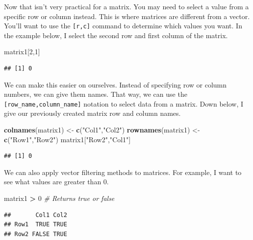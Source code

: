 \documentclass[
]{book}
\newenvironment{Shaded}{\begin{snugshade}}{\end{snugshade}}
\newcommand{\CommentTok}[1]{\textcolor[rgb]{0.56,0.35,0.01}{\textit{#1}}}
\newcommand{\DecValTok}[1]{\textcolor[rgb]{0.00,0.00,0.81}{#1}}
\newcommand{\KeywordTok}[1]{\textcolor[rgb]{0.13,0.29,0.53}{\textbf{#1}}}
\newcommand{\NormalTok}[1]{#1}
\newcommand{\OperatorTok}[1]{\textcolor[rgb]{0.81,0.36,0.00}{\textbf{#1}}}
\newcommand{\StringTok}[1]{\textcolor[rgb]{0.31,0.60,0.02}{#1}}
\begin{document}
Now that isn't very practical for a matrix. You may need to select a value from a specific row or column instead. This is where matrices are different from a vector. You'll want to use the \texttt{{[}r,c{]}} command to determine which values you want. In the example below, I select the second row and first column of the matrix.

\begin{Shaded}
\begin{Highlighting}[]
\NormalTok{matrix1[}\DecValTok{2}\NormalTok{,}\DecValTok{1}\NormalTok{]}
\end{Highlighting}
\end{Shaded}

\begin{verbatim}
## [1] 0
\end{verbatim}

We can make this easier on ourselves. Instead of specifying row or column numbers, we can give them names. That way, we can use the \texttt{{[}row\_name,column\_name{]}} notation to select data from a matrix. Down below, I give our previously created matrix row and column names.

\begin{Shaded}
\begin{Highlighting}[]
\KeywordTok{colnames}\NormalTok{(matrix1) <-}\StringTok{ }\KeywordTok{c}\NormalTok{(}\StringTok{"Col1"}\NormalTok{,}\StringTok{"Col2"}\NormalTok{)}
\KeywordTok{rownames}\NormalTok{(matrix1) <-}\StringTok{ }\KeywordTok{c}\NormalTok{(}\StringTok{"Row1"}\NormalTok{,}\StringTok{"Row2"}\NormalTok{)}
\NormalTok{matrix1[}\StringTok{"Row2"}\NormalTok{,}\StringTok{"Col1"}\NormalTok{]}
\end{Highlighting}
\end{Shaded}

\begin{verbatim}
## [1] 0
\end{verbatim}

We can also apply vector filtering methods to matrices. For example, I want to see what values are greater than 0.

\begin{Shaded}
\begin{Highlighting}[]
\NormalTok{matrix1 }\OperatorTok{>}\StringTok{ }\DecValTok{0} \CommentTok{# Returns true or false}
\end{Highlighting}
\end{Shaded}

\begin{verbatim}
##       Col1 Col2
## Row1  TRUE TRUE
## Row2 FALSE TRUE
\end{verbatim}
\end{document}
